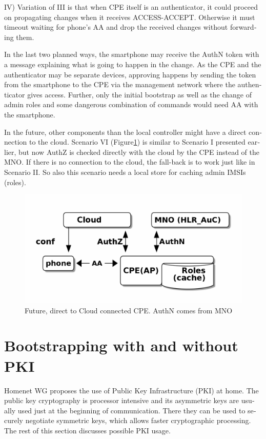 \documentclass[12pt,a4paper,english]{tutthesis}
\begin{document}
\begin{otherlanguage}{english}
IV) Variation of III is that when CPE itself is an authenticator, it
   could proceed on propagating changes when it receives
   ACCESS-ACCEPT. Otherwise it must timeout waiting for phone's AA and
   drop the received changes without forwarding them.


In the last two planned ways, the smartphone may receive the AuthN token
with a message explaining what is going to happen in the change.  As
the CPE and the authenticator may be separate devices, approving
happens by sending the token from the smartphone to the CPE via the
management network where the authenticator gives access.  Further,
only the initial bootstrap as well as the change of admin roles and
some dangerous combination of commands would need AA with the
smartphone.


\label{scenario-vi} 
In the future, other components than  the  local controller might 
have a direct connection to the cloud. 
Scenario VI (Figure\ref{fig:scenario-VI}) is similar to Scenario I presented
earlier, but now AuthZ is checked directly with the cloud by the CPE instead of
the MNO.  If there is no connection to the cloud, the fall-back is to work
just like in Scenario II. So also this scenario needs  a local store for caching
admin IMSIs (roles).

\begin{figure}[htb]
\centering
\includegraphics[width=.9\linewidth]{scenVI.png}
\caption{\label{fig:scenario-VI}Future, direct to Cloud connected CPE. AuthN comes from MNO}
\end{figure}


\section{Bootstrapping with and without PKI}
\label{sec-6-7}
\label{bootstrapping}


Homenet WG proposes the use of Public Key Infrastructure (PKI) at 
home. The public key cryptography is processor intensive and its
asymmetric keys are usually used just at the beginning of
communication. There they can be used to securely negotiate symmetric
keys,  which allows faster cryptographic processing.
The rest of this section discusses possible PKI usage.


\end{otherlanguage}
\end{document}
